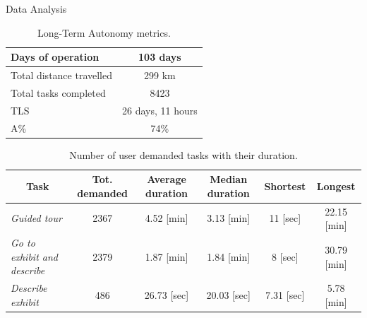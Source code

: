 \documentclass[english,svgnames,notes=hide,14pt]{beamer}
\begin{document}
\begin{frame}[shrink=58]{Data Analysis}
    \vspace{-1cm}
    \begin{table}
        \caption{Long-Term Autonomy metrics.}
        \label{tab:metrics}
        \centering
        \begin{tabular}{|l|c|}
        \hline
        {Days of operation} & 103 days \\ \hline
        {Total distance travelled} & 299 km \\ \hline
        {Total tasks completed} & 8423 \\ \hline
        {TLS} & 26 days, 11 hours \\ \hline
        {A\%} & 74\% \\ \hline
        \end{tabular}
    \end{table}
    \vspace{7.8cm}
    \begin{table}
        \caption{Number of user demanded tasks with their duration.}
        \label{tab:dem_tasks}
        \centering
        \begin{tabular}{|l|c|c|c|c|c|}
        \hline
        \multicolumn{1}{|c|}{\textbf{Task}} & \multicolumn{1}{c|}{\textbf{Tot. demanded}} & \textbf{Average duration} & \textbf{Median duration} & \textbf{Shortest} & \textbf{Longest} \\ \hline
        \textit{{Guided tour}} & 2367 & 4.52 {[}min{]} & 3.13 {[}min{]} & 11 {[}sec{]} & 22.15 {[}min{]} \\ \hline
        \textit{{Go to exhibit and describe}} & 2379 & 1.87 {[}min{]} & 1.84 {[}min{]} & 8 {[}sec{]} & 30.79 {[}min{]} \\ \hline
        \textit{{Describe exhibit}} & 486 & 26.73 {[}sec{]} & 20.03 {[}sec{]} & 7.31 {[}sec{]} & 5.78 {[}min{]} \\ \hline
        \end{tabular}
    \end{table}
    

\end{frame}
\end{document}
